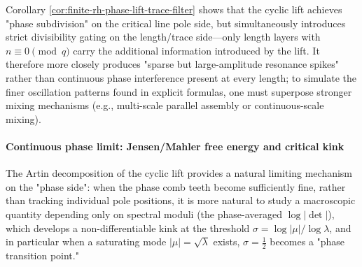 \begin{remark}[Mechanistic interpretation: phase comb teeth \texorpdfstring{$\neq$}{!=} phase mixing]\label{rem:finite-rh-phase-lift-divisibility-filter}
Corollary \ref{cor:finite-rh-phase-lift-trace-filter} shows that the cyclic lift achieves "phase subdivision" on the critical line pole side, but simultaneously introduces strict divisibility gating on the length/trace side---only length layers with \(n\equiv 0\pmod q\) carry the additional information introduced by the lift.
It therefore more closely produces "sparse but large-amplitude resonance spikes" rather than continuous phase interference present at every length; to simulate the finer oscillation patterns found in explicit formulas, one must superpose stronger mixing mechanisms (e.g., multi-scale parallel assembly or continuous-scale mixing).
\end{remark}

\paragraph{Continuous phase limit: Jensen/Mahler free energy and critical kink}\label{par:finite-rh-jensen-free-energy}
The Artin decomposition of the cyclic lift provides a natural limiting mechanism on the "phase side": when the phase comb teeth become sufficiently fine, rather than tracking individual pole positions, it is more natural to study a macroscopic quantity depending only on spectral moduli (the phase-averaged \(\log|\det|\)), which develops a non-differentiable kink at the threshold
\(\sigma=\log|\mu|/\log\lambda\),
and in particular when a saturating mode \(|\mu|=\sqrt{\lambda}\) exists, \(\sigma=\tfrac12\) becomes a "phase transition point."

